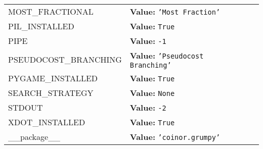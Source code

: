 \begin{longtable}{|p{\varnamewidth}|p{\vardescrwidth}|l}
\cline{1-2}
\raggedright M\-O\-S\-T\-\_\-F\-R\-A\-C\-T\-I\-O\-N\-A\-L\- & \raggedright \textbf{Value:} 
{\tt \texttt{'}\texttt{Most Fraction}\texttt{'}}&\\
\cline{1-2}
\raggedright P\-I\-L\-\_\-I\-N\-S\-T\-A\-L\-L\-E\-D\- & \raggedright \textbf{Value:} 
{\tt True}&\\
\cline{1-2}
\raggedright P\-I\-P\-E\- & \raggedright \textbf{Value:} 
{\tt -1}&\\
\cline{1-2}
\raggedright P\-S\-E\-U\-D\-O\-C\-O\-S\-T\-\_\-B\-R\-A\-N\-C\-H\-I\-N\-G\- & \raggedright \textbf{Value:} 
{\tt \texttt{'}\texttt{Pseudocost Branching}\texttt{'}}&\\
\cline{1-2}
\raggedright P\-Y\-G\-A\-M\-E\-\_\-I\-N\-S\-T\-A\-L\-L\-E\-D\- & \raggedright \textbf{Value:} 
{\tt True}&\\
\cline{1-2}
\raggedright S\-E\-A\-R\-C\-H\-\_\-S\-T\-R\-A\-T\-E\-G\-Y\- & \raggedright \textbf{Value:} 
{\tt None}&\\
\cline{1-2}
\raggedright S\-T\-D\-O\-U\-T\- & \raggedright \textbf{Value:} 
{\tt -2}&\\
\cline{1-2}
\raggedright X\-D\-O\-T\-\_\-I\-N\-S\-T\-A\-L\-L\-E\-D\- & \raggedright \textbf{Value:} 
{\tt True}&\\
\cline{1-2}
\raggedright \_\-\_\-p\-a\-c\-k\-a\-g\-e\-\_\-\_\- & \raggedright \textbf{Value:} 
{\tt \texttt{'}\texttt{coinor.grumpy}\texttt{'}}&\\
\cline{1-2}
\end{longtable}

